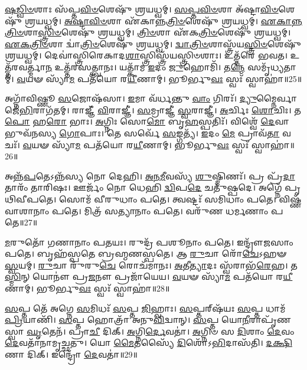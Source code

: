    \ul{𑌷}\-\-\ul{𑌡𑍍𑌵𑌿}\-\-\ul{𑍞}\-𑌶𑌾𑌃 𑌸᳴𑌪𑍍𑌤\-\ul{𑌵𑌿}\-\-\ul{𑍞}\-𑌶𑍇𑌷𑍁᳴ 𑌶𑍍𑌰𑌯𑌧𑍍𑌵𑌮𑍍।
   \ul{𑌸}\-\-\ul{𑌪𑍍𑌤}\-\-\ul{𑌵𑌿}\-\-\ul{𑍞}\-𑌶𑌾 𑌅᳴𑌷𑍍𑌟𑌾\-\ul{𑌵𑌿}\-\-\ul{𑍞}\-𑌶𑍇𑌷𑍁᳴ 𑌶𑍍𑌰𑌯𑌧𑍍𑌵𑌮𑍍।
   \ul{𑌅}\-\-\ul{𑌷𑍍𑌟𑌾}\-\-\ul{𑌵𑌿}\-\-\ul{𑍞}\-𑌶𑌾 𑌏᳴𑌕𑌾𑌨𑍍𑌨\-\-\ul{𑌤𑍍𑌰𑌿}\-\-\ul{𑍞}\-𑌶𑍇𑌷𑍁᳴ 𑌶𑍍𑌰𑌯𑌧𑍍𑌵𑌮𑍍।
   \ul{𑌏}\-\-\ul{𑌕𑌾}\-\-\ul{𑌨𑍍𑌨}\-\-\ul{𑌤𑍍𑌰𑌿}\-\-\ul{𑍞}\-𑌶𑌾\-\-\ul{𑌸𑍍𑌤𑍍𑌰𑌿}\-\-\ul{𑍞}\-𑌶𑍇𑌷𑍁᳴ 𑌶𑍍𑌰𑌯𑌧𑍍𑌵𑌮𑍍।
   \ul{𑌤𑍍𑌰𑌿}\-\-\ul{𑍞}\-𑌶𑌾 𑌏᳴𑌕\-\ul{𑌤𑍍𑌰𑌿}\-\-\ul{𑍞}\-𑌶𑍇𑌷𑍁᳴ 𑌶𑍍𑌰𑌯𑌧𑍍𑌵𑌮𑍍।
   \ul{𑌏}\-\-\ul{𑌕}\-\-\ul{𑌤𑍍𑌰𑌿}\-\-\ul{𑍞}\-𑌶𑌾 𑌦𑍍𑌵𑌾॑\-\ul{𑌤𑍍𑌰𑌿}\-\-\ul{𑍞}\-𑌶𑍇𑌷𑍁᳴ 𑌶𑍍𑌰𑌯𑌧𑍍𑌵𑌮𑍍।
   \ul{𑌦𑍍𑌵𑌾}\-\-\ul{𑌤𑍍𑌰𑌿}\-\-\ul{𑍞}\-𑌶𑌾𑌸𑍍𑌤𑍍𑌰᳴𑌯\-\-\ul{𑌸𑍍𑌤𑍍𑌰𑌿}\-\-\ul{𑍞}\-\-𑌶𑍇𑌷𑍁᳴ 𑌶𑍍𑌰𑌯𑌧𑍍𑌵𑌮𑍍।
   𑌦𑍇𑌵𑌾॑𑌸𑍍𑌤𑍍𑌰𑌿𑌰𑍇𑌕𑌾\-𑌦\-\ul{𑌶𑌾}\-𑌸𑍍𑌤𑍍𑌰𑌿𑌸𑍍𑌤𑍍𑌰᳴𑌯\-𑌸𑍍𑌤𑍍𑌰𑌿𑍞𑌶𑌾𑌃।
   𑌉𑌤𑍍𑌤᳴𑌰𑍇 𑌭𑌵𑌤।
   𑌉𑌤𑍍𑌤᳴𑌰𑌵𑌰𑍍𑌤𑍍𑌮𑌾\-\ul{𑌨} 𑌉𑌤𑍍𑌤᳴𑌰𑌸𑌤𑍍𑌤𑍍𑌵𑌾𑌨𑌃।
   𑌯𑌤𑍍𑌕𑌾᳴𑌮 \ul{𑌇}\-𑌦𑌂 \ul{𑌜𑍁}\-𑌹𑍋𑌮𑌿᳴।
   𑌤\-\ul{𑌨𑍍𑌮𑍇} 𑌸𑌮𑍃᳴𑌧𑍍𑌯𑌤𑌾𑌮𑍍।
   \ul{𑌵}\-𑌯𑍟 𑌸𑍍𑌯𑌾᳴\-\ul{𑌮} 𑌪𑌤᳴𑌯𑍋 𑌰\-\ul{𑌯𑍀}\-𑌣𑌾𑌮𑍍।
   𑌭𑍂𑌰𑍍𑌭𑍁\-\ul{𑌵𑌃} 𑌸𑍍𑌵𑌃᳴ 𑌸𑍍𑌵𑌾𑌹𑌾॑॥25॥
   \anuvakamend
   
   𑌅𑌗𑍍𑌨𑌾᳴𑌵𑌿𑌷𑍍𑌣𑍂 \ul{𑌸}\-𑌜𑍋𑌷᳴𑌸𑌾।
   \ul{𑌇}\-𑌮𑌾 𑌵᳴𑌰𑍍𑌧𑌨𑍍𑌤𑍁 \ul{𑌵𑌾𑌂} 𑌗𑌿𑌰𑌃᳴।
   \ul{𑌦𑍍𑌯𑍁}\-𑌮𑍍𑌨𑍈𑌰𑍍𑌵𑌾𑌜𑍇᳴\-\ul{𑌭𑌿}\-𑌰𑌾𑌗᳴𑌤𑌮𑍍।
   𑌰𑌾𑌜𑍍𑌞𑍀᳴ \ul{𑌵𑌿}\-𑌰𑌾𑌜𑍍𑌞𑍀॑।
   \ul{𑌸}\-𑌮𑍍𑌰𑌾𑌜𑍍𑌞𑍀॑ \ul{𑌸𑍍𑌵}\-𑌰𑌾𑌜𑍍𑌞𑍀॑।
   \ul{𑌅}\-𑌰𑍍𑌚𑌿𑌃 \ul{𑌶𑍋}\-𑌚𑌿𑌃।
   𑌤\-\ul{𑌪𑍋} 𑌹\-\ul{𑌰𑍋} 𑌭𑌾𑌃।
   \ul{𑌅}\-𑌗𑍍𑌨𑌿𑌃 𑌸𑍋\-\ul{𑌮𑍋} 𑌬𑍃\-\ul{𑌹}\-𑌸𑍍𑌪𑌤𑌿𑌃᳴।
   𑌵𑌿𑌶𑍍𑌵𑍇᳴ \ul{𑌦𑍇}\-𑌵𑌾 𑌭𑍁𑌵᳴𑌨𑌸𑍍𑌯 \ul{𑌗𑍋}\-𑌪𑌾𑌃।
   𑌤𑍇 𑌸𑌰𑍍𑌵𑍇᳴ \ul{𑌸}\-𑌙𑍍𑌗𑌤𑍍𑌯᳴।
   \ul{𑌇}\-𑌦𑌂 \ul{𑌮𑍇} 𑌪𑍍𑌰𑌾𑌵᳴\-\ul{𑌤𑌾} 𑌵𑌚𑌃᳴।
   \ul{𑌵}\-𑌯𑍟 𑌸𑍍𑌯𑌾᳴\-\ul{𑌮} 𑌪𑌤᳴𑌯𑍋 𑌰\-\ul{𑌯𑍀}\-𑌣𑌾𑌮𑍍।
   𑌭𑍂𑌰𑍍𑌭𑍁\-\ul{𑌵𑌃} 𑌸𑍍𑌵𑌃᳴ 𑌸𑍍𑌵𑌾𑌹𑌾॑॥26॥
   \anuvakamend
   
   𑌅𑌨𑍍𑌨᳴\-\ul{𑌪}\-𑌤𑍇𑌽𑌨𑍍𑌨᳴𑌸𑍍𑌯 𑌨𑍋 𑌦𑍇𑌹𑌿।
   \ul{𑌅}\-\-\ul{𑌨}\-\-\ul{𑌮𑍀}\-𑌵𑌸𑍍𑌯᳴ \ul{𑌶𑍁}\-𑌷𑍍𑌮𑌿𑌣𑌃᳴।
   𑌪𑍍𑌰 𑌪𑍍𑌰᳴\-\ul{𑌦𑌾}\-𑌤𑌾𑌰𑌂᳴ 𑌤𑌾𑌰𑌿𑌷𑌃।
   𑌊𑌰𑍍𑌜𑌂᳴ 𑌨𑍋 𑌧𑍇𑌹𑌿 \ul{𑌦𑍍𑌵𑌿}\-𑌪\-\ul{𑌦𑍇} 𑌚𑌤𑍁᳴𑌷𑍍𑌪𑌦𑍇।
   𑌅𑌗𑍍𑌨𑍇᳴ 𑌪𑍃𑌥𑌿𑌵𑍀𑌪𑌤𑍇।
   𑌸𑍋𑌮᳴ 𑌵𑍀𑌰𑍁𑌧𑌾𑌂 𑌪𑌤𑍇।
   𑌤𑍍𑌵𑌷𑍍𑌟𑌃᳴ 𑌸𑌮𑌿𑌧𑌾𑌂 𑌪𑌤𑍇।
   𑌵𑌿𑌷𑍍𑌣᳴𑌵𑌾𑌶𑌾𑌨𑌾𑌂 𑌪𑌤𑍇।
   𑌮𑌿𑌤𑍍𑌰᳴ 𑌸𑌤𑍍𑌯𑌾𑌨𑌾𑌂 𑌪𑌤𑍇।
   𑌵𑌰𑍁᳴𑌣 𑌧𑌰𑍍𑌮𑌣𑌾𑌂 𑌪𑌤𑍇॥27॥

   \ul{𑌮}\-𑌰𑍁𑌤𑍋᳴  𑌗𑌣𑌾𑌨𑌾𑌂 𑌪𑌤𑌯𑌃।
   𑌰𑍁𑌦𑍍𑌰᳴ 𑌪𑌶𑍂𑌨𑌾𑌂 𑌪𑌤𑍇।
   𑌇𑌨𑍍𑌦𑍍𑌰𑍗᳴𑌜𑌸𑌾𑌂 𑌪𑌤𑍇।
   𑌬𑍃𑌹᳴𑌸𑍍𑌪𑌤𑍇 𑌬𑍍𑌰𑌹𑍍𑌮𑌣𑌸𑍍𑌪𑌤𑍇।
   𑌆 \ul{𑌰𑍁}\-𑌚𑌾 𑌰𑍋᳴\-\ul{𑌚𑍇}\-𑌽𑌹𑍟 \ul{𑌸𑍍𑌵}\-𑌯𑌮𑍍।
   \ul{𑌰𑍁}\-𑌚𑌾 𑌰𑍁᳴𑌰𑍁\-\ul{𑌚𑍇} 𑌰𑍋𑌚᳴𑌮𑌾𑌨𑌃।
   \ul{𑌅}\-𑌤𑍀\-\ul{𑌤𑍍𑌯𑌾}\-𑌦𑌃 𑌸𑍍𑌵᳴𑌰𑌾𑌭᳴\-\ul{𑌰𑍇}\-𑌹।
   𑌤\-\ul{𑌸𑍍𑌮𑌿}\-𑌨𑍍 𑌯𑍋𑌨𑍗॑ 𑌪𑍍𑌰\-\ul{𑌜}\-𑌨𑍗 𑌪𑍍𑌰𑌜𑌾᳴𑌯𑍇𑌯।
   \ul{𑌵}\-𑌯𑍟 𑌸𑍍𑌯𑌾᳴\-\ul{𑌮} 𑌪𑌤᳴𑌯𑍋 𑌰\-\ul{𑌯𑍀}\-𑌣𑌾𑌮𑍍।
   𑌭𑍂𑌰𑍍𑌭𑍁\-\ul{𑌵𑌃} 𑌸𑍍𑌵𑌃᳴ 𑌸𑍍𑌵𑌾𑌹𑌾॑॥28॥
  \anuvakamend
  
    \ul{𑌸}\-𑌪𑍍𑌤 𑌤𑍇᳴ 𑌅𑌗𑍍𑌨𑍇 \ul{𑌸}\-𑌮𑌿𑌧𑌃᳴ \ul{𑌸}\-𑌪𑍍𑌤 \ul{𑌜𑌿}\-𑌹𑍍𑌵𑌾𑌃।
   \ul{𑌸}\-𑌪𑍍𑌤𑌰𑍍{‌}𑌷᳴𑌯𑌃 \ul{𑌸}\-𑌪𑍍𑌤 𑌧𑌾𑌮᳴ \ul{𑌪𑍍𑌰𑌿}\-𑌯𑌾𑌣𑌿᳴।
   \ul{𑌸}\-𑌪𑍍𑌤 𑌹𑍋𑌤𑍍𑌰𑌾᳴ 𑌅𑌨𑍁\-\ul{𑌵𑌿}\-𑌦𑍍𑌵𑌾𑌨𑍍।
   \ul{𑌸}\-𑌪𑍍𑌤 𑌯𑍋\-\ul{𑌨𑍀}\-𑌰𑌾𑌪𑍃᳴𑌣𑌸𑍍𑌵𑌾 \ul{𑌘𑍃}\-𑌤𑍇𑌨᳴।
   𑌪𑍍𑌰𑌾\-\ul{𑌚𑍀} 𑌦𑌿𑌕𑍍।
   \ul{𑌅}\-𑌗𑍍𑌨𑌿\-\ul{𑌰𑍍𑌦𑍇}\-𑌵𑌤𑌾॑।
   \ul{𑌅}\-𑌗𑍍𑌨𑌿𑍞 𑌸 \ul{𑌦𑌿}\-𑌶𑌾𑌂 \ul{𑌦𑍇}\-𑌵𑌂 \ul{𑌦𑍇}\-𑌵𑌤𑌾᳴𑌨𑌾𑌮𑍃𑌚𑍍𑌛𑌤𑍁।
   𑌯𑍋 \ul{𑌮𑍈}\-𑌤𑌸𑍍𑌯𑍈᳴ \ul{𑌦𑌿}\-𑌶𑍋᳴𑌽\-\ul{𑌭𑌿}\-𑌦𑌾𑌸᳴𑌤𑌿।
   \ul{𑌦}\-\-\ul{𑌕𑍍𑌷𑌿}\-𑌣𑌾 𑌦𑌿𑌕𑍍।
   𑌇𑌨𑍍𑌦𑍍𑌰𑍋᳴ \ul{𑌦𑍇}\-𑌵𑌤𑌾॑॥29॥

